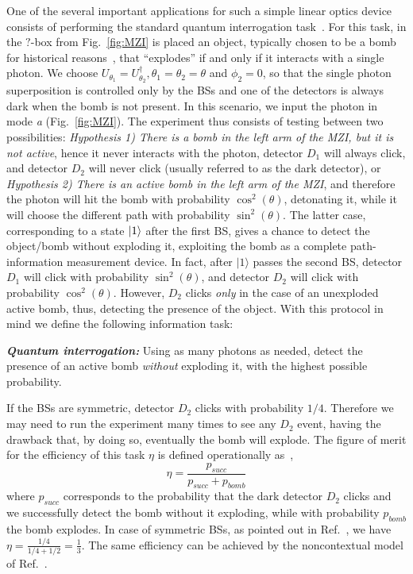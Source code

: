 \documentclass[a4paper,twocolumn,11pt,accepted=2024-01-17]{quantumarticle}
\begin{document}
One of the several important applications for such a simple linear optics device consists of performing the standard quantum interrogation task~\cite{elitzur1993quantum,vaidman1996interaction}. For this task, in the $?$-box from Fig.~\ref{fig:MZI} is placed an object, typically chosen to be a bomb for historical reasons~\cite{elitzur1993quantum}, that ``explodes'' if and only if it interacts with a single photon. We choose $U_{\theta_1}=U_{\theta_2}^\dagger, \theta_1=\theta_2=\theta$ and $\phi_2=0$, so that the single photon superposition is controlled only by the BSs and one of the detectors is always dark when the bomb is not present. In this scenario, we input the photon in mode \textit{a} (Fig.~\ref{fig:MZI}). The experiment thus consists of testing between two possibilities: \textit{Hypothesis 1) There is a bomb in the left arm of the MZI, but it is not active}, hence it never interacts with the photon,  detector $D_1$ will always click, and detector $D_2$ will never click (usually referred to as the dark detector), or \textit{Hypothesis 2) There is an active bomb in the left arm of the MZI}, and therefore the photon will hit the bomb with probability $\cos^2(\theta)$, detonating it, while it will choose the different path with probability $\sin^2(\theta)$. The latter case, corresponding to a state $\ket{1}$ after the first BS, gives a chance to detect the object/bomb without exploding it, exploiting the bomb as a complete path-information measurement device. In fact, after $\vert 1 \rangle$ passes the second BS, detector $D_1$ will click with probability $\sin^2(\theta)$, and detector $D_2$ will click with probability $\cos^2(\theta)$. However, $D_2$ clicks \textit{only} in the case of an unexploded active bomb, thus, detecting the presence of the object. With this protocol in mind we define the following information task:
\begin{tcolorbox}[colback=blue!6,colframe=blue!35,left=1mm,right=1mm,top=1mm,bottom=1mm,arc=0mm]
\textit{\textbf{Quantum interrogation:}} Using as many photons as needed, detect the presence of an active bomb \textit{without} exploding it, with the highest possible probability.
\end{tcolorbox}

If the BSs are symmetric, detector $D_2$ clicks with probability $1/4$. Therefore we may need to run the experiment many times to see any $D_2$ event, having the drawback that, by doing so, eventually the bomb will explode. The figure of merit for the efficiency of this task $\eta$ is defined operationally as~\cite{elitzur1993quantum,kwiat1995interactionfree},
\begin{equation}\label{eq: efficiency}
    \eta = \frac{p_{succ}}{p_{succ} + p_{bomb}}
\end{equation}
where $p_{succ}$ corresponds to the probability that the dark detector $D_2$ clicks and we successfully detect the bomb without it exploding, while with probability $p_{bomb}$ the bomb explodes. In case of symmetric BSs, as pointed out in Ref.~\cite{elitzur1993quantum}, we have $\eta = \frac{1/4}{1/4+1/2} = \frac{1}{3}$. The same efficiency can be achieved by the noncontextual model of Ref.~\cite{catani2021interference}.
\end{document}
